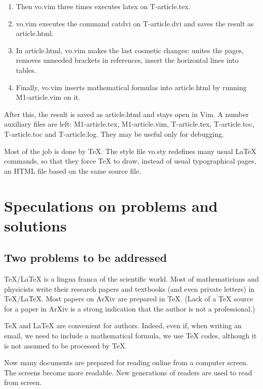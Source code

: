\documentclass{article}
\begin{document}
\begin{enumerate}
) are 
replaced with commands, whose arguments are surrounded with braces (like 
\begin{verbatim} \textbf and \textit \end{verbatim}
).
\item Then vo.vim three times executes latex on T-article.tex.
\item vo.vim executes the command catdvi on T-article.dvi and 
saves the result as article.html.
\item In article.html, vo.vim makes the last cosmetic changes: 
unites the pages, removes unneeded brackets in references, insert the
horizontal lines into tables.
\item Finally, vo.vim inserts mathematical formulas into article.html 
by running M1-article.vim on it.  
\end{enumerate}

After this, the result is saved as article.html and stays open in Vim.
A number auxiliary files are left: M1-article.tex, M1-article.vim,
T-article.tex, T-article.toc, T-article.toc and T-article.log. They may be
useful only for debugging. 

Most of the job is done by TeX. The style file vo.sty redefines many 
usual LaTeX commands, so that they force TeX to draw, instead of usual 
typographical pages, an HTML file based on the same source file. 
   
\section{Speculations on problems and solutions}\label{s4}

\subsection{Two problems to be addressed}\label{s4.1}
TeX/LaTeX is a lingua franca of the scientific world.
Most of mathematicians and physicists write their research papers and
textbooks (and even private letters) in TeX/LaTeX. 
Most papers on ArXiv are prepared in TeX. (Lack of a 
TeX source for a paper in ArXiv is a strong indication that the author 
is not a professional.)

TeX and LaTeX are convenient for authors. Indeed, even if, when writing an
email, we need to include a mathematical formula, we use TeX codes, 
although it is not assumed to be processed by TeX. 

Now many documents are prepared for reading online from a computer screen.  
The screens become more readable. New generations of readers are used 
to read from screen. 
\end{document}
